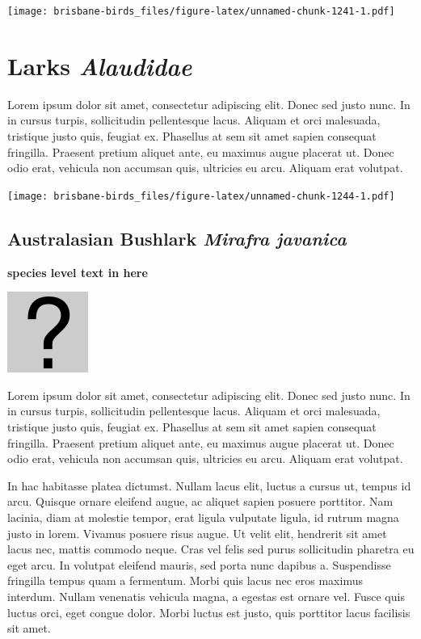 \documentclass[]{book}
\let\origfigure\figure
\let\endorigfigure\endfigure
\renewenvironment{figure}[1][2] {
  \expandafter\origfigure\expandafter[H]
} {
  \endorigfigure
}
\begin{document}
\begin{figure}
\centering
\texttt{[image: brisbane-birds\_files/figure-latex/unnamed-chunk-1241-1.pdf]}
\caption{\label{fig:unnamed-chunk-1241}insert figure caption}
\end{figure}

\chapter{\texorpdfstring{Larks
\emph{Alaudidae}}{Larks Alaudidae}}\label{larks-alaudidae}

Lorem ipsum dolor sit amet, consectetur adipiscing elit. Donec sed justo
nunc. In in cursus turpis, sollicitudin pellentesque lacus. Aliquam et
orci malesuada, tristique justo quis, feugiat ex. Phasellus at sem sit
amet sapien consequat fringilla. Praesent pretium aliquet ante, eu
maximus augue placerat ut. Donec odio erat, vehicula non accumsan quis,
ultricies eu arcu. Aliquam erat volutpat.

\texttt{[image: brisbane-birds\_files/figure-latex/unnamed-chunk-1244-1.pdf]}

\section{\texorpdfstring{Australasian Bushlark \emph{Mirafra
javanica}}{Australasian Bushlark Mirafra javanica}}\label{australasian-bushlark-mirafra-javanica}

\textbf{species level text in here}

\begin{figure}
\centering
\includegraphics{assets/missing.png}
\caption{No image for species}
\end{figure}

Lorem ipsum dolor sit amet, consectetur adipiscing elit. Donec sed justo
nunc. In in cursus turpis, sollicitudin pellentesque lacus. Aliquam et
orci malesuada, tristique justo quis, feugiat ex. Phasellus at sem sit
amet sapien consequat fringilla. Praesent pretium aliquet ante, eu
maximus augue placerat ut. Donec odio erat, vehicula non accumsan quis,
ultricies eu arcu. Aliquam erat volutpat.

In hac habitasse platea dictumst. Nullam lacus elit, luctus a cursus ut,
tempus id arcu. Quisque ornare eleifend augue, ac aliquet sapien posuere
porttitor. Nam lacinia, diam at molestie tempor, erat ligula vulputate
ligula, id rutrum magna justo in lorem. Vivamus posuere risus augue. Ut
velit elit, hendrerit sit amet lacus nec, mattis commodo neque. Cras vel
felis sed purus sollicitudin pharetra eu eget arcu. In volutpat eleifend
mauris, sed porta nunc dapibus a. Suspendisse fringilla tempus quam a
fermentum. Morbi quis lacus nec eros maximus interdum. Nullam venenatis
vehicula magna, a egestas est ornare vel. Fusce quis luctus orci, eget
congue dolor. Morbi luctus est justo, quis porttitor lacus facilisis sit
amet.
\end{document}
